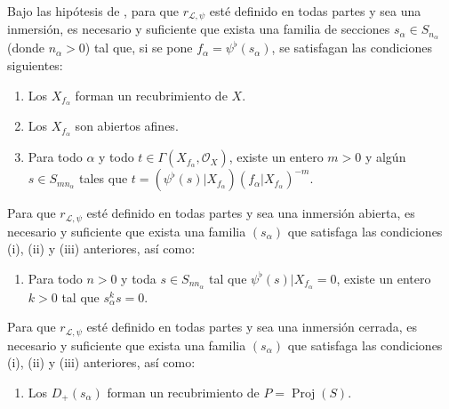 \documentclass[oneside,10pt]{amsart}
\let\EGAOriginalLabel\label
\renewcommand{\label}[1]{\phantomsection\EGAOriginalLabel{#1}}
\begin{document}
\begin{proposition}[3.8.2]
\label{II.3.8.2-fr}
Bajo las hipótesis de , para que $r_{\mathcal{L},\psi}$ esté definido en todas partes y sea una inmersión, es necesario y suficiente que exista una familia de secciones $s_\alpha\in S_{n_\alpha}$ (donde $n_\alpha>0$) tal que, si se pone $f_\alpha=\psi^\flat(s_\alpha)$, se satisfagan las condiciones siguientes:
\begin{enumerate}
  \item[\textup{(i)}] Los $X_{f_\alpha}$ forman un recubrimiento de $X$.
  \item[\textup{(ii)}] Los $X_{f_\alpha}$ son abiertos afines.
  \item[\textup{(iii)}] Para todo $\alpha$ y todo $t\in\Gamma(X_{f_\alpha},\mathcal{O}_X)$, existe un entero $m>0$ y algún $s\in S_{mn_\alpha}$ tales que $t=(\psi^\flat(s)|X_{f_\alpha})(f_\alpha|X_{f_\alpha})^{-m}$.
\end{enumerate}

Para que $r_{\mathcal{L},\psi}$ esté definido en todas partes y sea una inmersión abierta, es necesario y suficiente que exista una familia $(s_\alpha)$ que satisfaga las condiciones \textup{(i), (ii) y (iii)} anteriores, así como:
\begin{enumerate}
  \item[\textup{(iv)}] Para todo $n>0$ y toda $s\in S_{nn_\alpha}$ tal que $\psi^\flat(s)|X_{f_\alpha}=0$, existe un entero $k>0$ tal que $s_\alpha^ks=0$.
\end{enumerate}

Para que $r_{\mathcal{L},\psi}$ esté definido en todas partes y sea una inmersión cerrada, es necesario y suficiente que exista una familia $(s_\alpha)$ que satisfaga las condiciones \textup{(i), (ii) y (iii)} anteriores, así como:
\begin{enumerate}
  \item[\textup{(v)}] Los $D_+(s_\alpha)$ forman un recubrimiento de $P=\operatorname{Proj}(S)$.
\end{enumerate}
\end{proposition}
\end{document}
